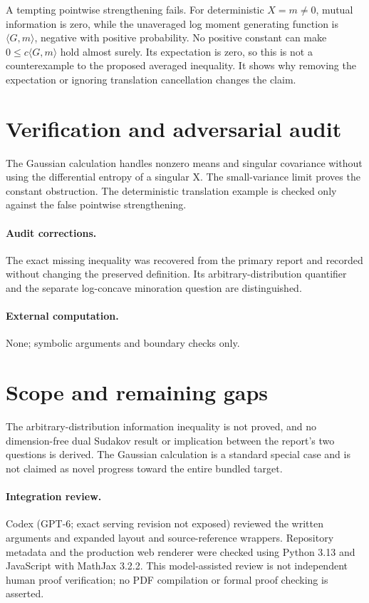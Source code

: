 \documentclass[11pt]{article}
\begin{document}
A tempting pointwise strengthening fails. For deterministic $X=m\ne0$, mutual information is zero, while the unaveraged log moment generating function is $\langle G,m\rangle$, negative with positive probability. No positive constant can make $0\le c\langle G,m\rangle$ hold almost surely. Its expectation is zero, so this is not a counterexample to the proposed averaged inequality. It shows why removing the expectation or ignoring translation cancellation changes the claim.
\section{Verification and adversarial audit}
The Gaussian calculation handles nonzero means and singular covariance without using the differential entropy of a singular X. The small-variance limit proves the constant obstruction. The deterministic translation example is checked only against the false pointwise strengthening.
\paragraph{Audit corrections.} The exact missing inequality was recovered from the primary report and recorded without changing the preserved definition. Its arbitrary-distribution quantifier and the separate log-concave minoration question are distinguished.
\paragraph{External computation.} None; symbolic arguments and boundary checks only.
\section{Scope and remaining gaps}
The arbitrary-distribution information inequality is not proved, and no dimension-free dual Sudakov result or implication between the report's two questions is derived. The Gaussian calculation is a standard special case and is not claimed as novel progress toward the entire bundled target.
\paragraph{Integration review.} Codex (GPT-6; exact serving revision not exposed) reviewed the written arguments and expanded layout and source-reference wrappers. Repository metadata and the production web renderer were checked using Python 3.13 and JavaScript with MathJax 3.2.2. This model-assisted review is not independent human proof verification; no PDF compilation or formal proof checking is asserted.
\end{document}
